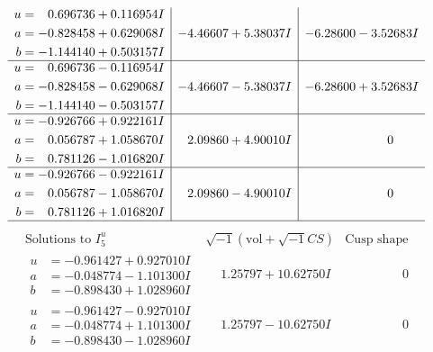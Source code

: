 \documentclass[1p]{elsarticle_modified}
\theoremstyle{definition}
\newcommand{\I}{\sqrt{-1}}
\begin{document}
$$\begin{array}{c|c|c}
\begin{aligned}
u &= \phantom{-}0.696736 + 0.116954 I \\
a &= -0.828458 + 0.629068 I \\
b &= -1.144140 + 0.503157 I\end{aligned}
 & -4.46607 + 5.38037 I & -6.28600 - 3.52683 I \\ \hline\begin{aligned}
u &= \phantom{-}0.696736 - 0.116954 I \\
a &= -0.828458 - 0.629068 I \\
b &= -1.144140 - 0.503157 I\end{aligned}
 & -4.46607 - 5.38037 I & -6.28600 + 3.52683 I \\ \hline\begin{aligned}
u &= -0.926766 + 0.922161 I \\
a &= \phantom{-}0.056787 + 1.058670 I \\
b &= \phantom{-}0.781126 - 1.016820 I\end{aligned}
 & \phantom{-}2.09860 + 4.90010 I & \phantom{-0.000000 } 0 \\ \hline\begin{aligned}
u &= -0.926766 - 0.922161 I \\
a &= \phantom{-}0.056787 - 1.058670 I \\
b &= \phantom{-}0.781126 + 1.016820 I\end{aligned}
 & \phantom{-}2.09860 - 4.90010 I & \phantom{-0.000000 } 0\\
 \hline 
 \end{array}$$\newpage$$\begin{array}{c|c|c}  
\text{Solutions to }I^u_{5}& \I (\text{vol} + \sqrt{-1}CS) & \text{Cusp shape}\\
 \hline 
\begin{aligned}
u &= -0.961427 + 0.927010 I \\
a &= -0.048774 - 1.101300 I \\
b &= -0.898430 + 1.028960 I\end{aligned}
 & \phantom{-}1.25797 + 10.62750 I & \phantom{-0.000000 } 0 \\ \hline\begin{aligned}
u &= -0.961427 - 0.927010 I \\
a &= -0.048774 + 1.101300 I \\
b &= -0.898430 - 1.028960 I\end{aligned}
 & \phantom{-}1.25797 - 10.62750 I & \phantom{-0.000000 } 0 \\ \hline\begin{aligned}

\end{aligned}
\end{array}$$
\end{document}
